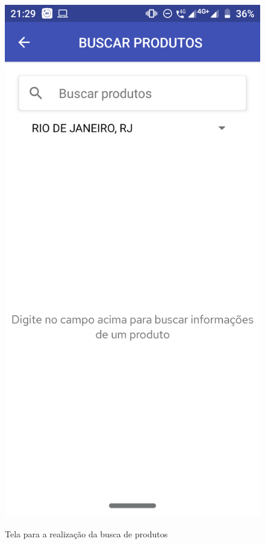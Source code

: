 \begin{figure}[h]
    \centering
    \caption{Tela para a realização da busca de produtos}
    \includegraphics[scale=0.15]{tcc/figures/app/app_buscar_produtos.png}
    \label{appBuscaProdutosInicialFig}
\end{figure}

